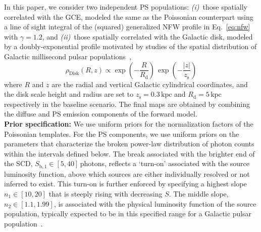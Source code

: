 \documentclass[prd,aps,10pt,nofootinbib,twocolumn,superscriptaddress,preprintnumbers,balancelastpage,longbibliography,floatfix]{revtex4-2}
\begin{document}
In this paper, we consider two independent PS populations: \emph{(i)}~those spatially correlated with the GCE, modeled the same as the Poissonian counterpart using a line of sight integral of the (squared) generalized NFW profile in Eq.~\eqref{eq:nfw} with $\gamma = 1.2$, and \emph{(ii)}~those spatially correlated with the Galactic disk, modeled by a doubly-exponential profile motivated by studies of the spatial distribution of Galactic millisecond pulsar populations~\cite{Lorimer:2006qs, Bartels:2018xom},
\begin{equation}
\label{eq:disk_spatial}
\rho_\mathrm{Disk}(R, z) \propto \exp \left(-\frac{R}{R_\mathrm{d}}\right) \, \exp\left(-\frac{|z|}{z_\mathrm{s}}\right)
\end{equation}
where $R$ and $z$ are the radial and vertical Galactic cylindrical coordinates, and the disk scale height and radius are set to $z_\mathrm{s} = 0.3\,\mathrm{kpc}$ and $R_\mathrm{d} = 5\,\mathrm{kpc}$ respectively in the baseline scenario. The final maps are obtained by combining the diffuse and PS emission components of the forward model. \\ 

\noindent
\textbf{Prior specification:} We use uniform priors for the normalization factors of the Poissonian templates. For the PS components, we use uniform priors on the parameters that characterize the broken power-law  distribution of photon counts within the intervals defined below. The break associated with the brighter end of the SCD, $S_{\mathrm{b}, 1}  \in  [5, 40]$\,photons, reflects a `turn-on' associated with the source luminosity function, above which sources are either individually resolved or not inferred to exist. This turn-on is further enforced by specifying a highest slope $n_1 \in [10, 20]$ that is steeply rising with decreasing $S$. The middle slope, $n_2 \in [1.1, 1.99]$, is associated with the physical luminosity function of the source population, typically expected to be in this specified range for a Galactic pulsar population~\cite{Ploeg:2020jeh}. 
\end{document}
